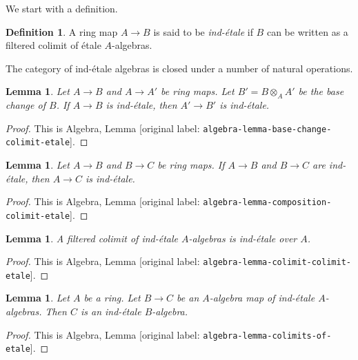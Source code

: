 \documentclass[10pt,a4paper]{article}
\theoremstyle{plain}
\newtheorem{lemma}[subsection]{Lemma}
\theoremstyle{definition}
\newtheorem{definition}[subsection]{Definition}
\theoremstyle{remark}
\numberwithin{equation}{subsection}
\begin{document}
\noindent
We start with a definition.

\begin{definition}
\label{definition-ind-etale}
A ring map $A \to B$ is said to be {\it ind-\'etale} if $B$ can be written
as a filtered colimit of \'etale $A$-algebras.
\end{definition}

\noindent
The category of ind-\'etale algebras is closed under a number of natural
operations.

\begin{lemma}
\label{lemma-base-change-ind-etale}
Let $A \to B$ and $A \to A'$ be ring maps. Let $B' = B \otimes_A A'$
be the base change of $B$.
If $A \to B$ is ind-\'etale, then $A' \to B'$ is ind-\'etale.
\end{lemma}

\begin{proof}
This is Algebra, Lemma \textnormal{[original label: \nolinkurl{algebra-lemma-base-change-colimit-etale}]}.
\end{proof}

\begin{lemma}
\label{lemma-composition-ind-etale}
Let $A \to B$ and $B \to C$ be ring maps. If $A \to B$ and $B \to C$
are ind-\'etale, then $A \to C$ is ind-\'etale.
\end{lemma}

\begin{proof}
This is Algebra, Lemma \textnormal{[original label: \nolinkurl{algebra-lemma-composition-colimit-etale}]}.
\end{proof}

\begin{lemma}
\label{lemma-ind-ind-etale}
A filtered colimit of ind-\'etale $A$-algebras is ind-\'etale over $A$.
\end{lemma}

\begin{proof}
This is Algebra, Lemma \textnormal{[original label: \nolinkurl{algebra-lemma-colimit-colimit-etale}]}.
\end{proof}

\begin{lemma}
\label{lemma-ind-etale-permanence}
Let $A$ be a ring. Let $B \to C$ be an $A$-algebra map of ind-\'etale
$A$-algebras. Then $C$ is an ind-\'etale $B$-algebra.
\end{lemma}

\begin{proof}
This is Algebra, Lemma \textnormal{[original label: \nolinkurl{algebra-lemma-colimits-of-etale}]}.
\end{proof}
\end{document}
